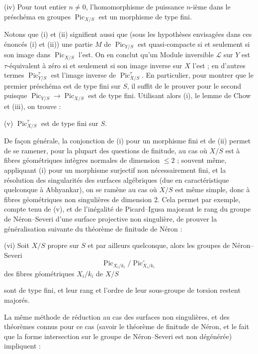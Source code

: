 \noindent(iv) Pour tout entier $n\neq0$, l'homomorphisme de puissance
$n$-ième dans le préschéma en groupes $\operatorname{Pic}_{X/S}$ est un
morphisme de type fini.

Notons que (i) et (ii) signifient aussi que (sous les hypothèses envisagées
dans ces énoncés (i) et (ii)) une partie $M$ de
$\operatorname{Pic}_{Y/S}$ est quasi-compacte si et seulement si son image
dans $\operatorname{Pic}_{X/S}$ l'est. On en conclut qu'un Module inversible
$\mathcal L$ sur $Y$ est $\tau$-équivalent à zéro si et seulement si son image
inverse sur $X$ l'est ; en d'autres termes
$\operatorname{Pic}_{Y/S}^\tau$ est l'image inverse de
$\operatorname{Pic}_{X/S}^\tau$. En particulier, pour montrer que le premier
préschéma est de type fini sur $S$, il suffit de le prouver pour le second
puisque $\operatorname{Pic}_{Y/S}\longrightarrow
\operatorname{Pic}_{X/S}$ est de type fini. Utilisant alors (i), le lemme de
Chow et (iii), on trouve :

\medskip
\noindent(v) $\operatorname{Pic}_{X/S}^\tau$ est de type fini sur $S$.

De façon générale, la conjonction de (i) pour un morphisme fini et de (ii)
permet de se ramener, pour la plupart des questions de finitude, au cas où
$X/S$ est à fibres géométriques intègres normales de dimension $\leq2$ ;
souvent même, appliquant (i) pour un morphisme surjectif non nécessairement
fini, et la résolution des singularités des surfaces algébriques (due en
caractéristique quelconque à Abhyankar), on se ramène au cas où $X/S$ est même
simple, donc à fibres géométriques non singulières de dimension 2. Cela permet
par exemple, compte tenu de (v), et de l'inégalité de Picard--Igusa majorant le
rang du groupe de Néron--Severi d'une surface projective non singulière, de
prouver la généralisation suivante du théorème de finitude de Néron :

\medskip
\noindent(vi) Soit $X/S$ propre sur $S$ et par ailleurs quelconque, alors les
groupes de Néron--Severi
\[
\operatorname{Pic}_{X_i/k_i}/\operatorname{Pic}_{X_i/k_i}^\circ
\]
des fibres géométriques $X_i/k_i$ de $X/S$

sont de type fini, et leur rang et l'ordre de leur sous-groupe de torsion
restent majorés.

La même méthode de réduction au cas des surfaces non singulières, et des
théorèmes connus pour ce cas (savoir le théorème de finitude de Néron, et le
fait que la forme intersection sur le groupe de Néron--Severi est non
dégénérée) impliquent :


